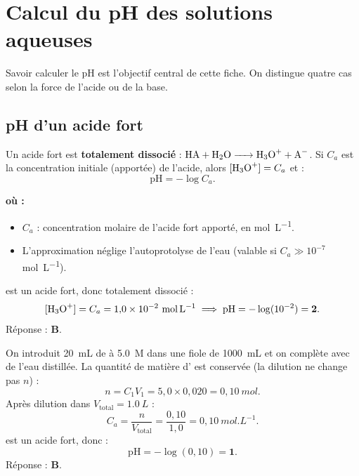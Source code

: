 \documentclass[11pt,a4paper]{article}
\newenvironment{ou}{%
  \par\smallskip\noindent\textbf{où :}\nopagebreak
  \begin{itemize}[leftmargin=1.8em,topsep=2pt,itemsep=1.5pt,parsep=0pt]}%
  {\end{itemize}}
\begin{document}
\section{Calcul du pH des solutions aqueuses}
\label{sec:pHfaible}
Savoir calculer le pH est l'objectif central de cette fiche. On distingue quatre cas selon la force de
l'acide ou de la base.

\subsection{pH d'un acide fort}

\begin{formule}
Un acide fort  est \textbf{totalement dissocié} : $\ce{HA + H2O -> H3O+ + A-}$. Si $C_a$ est la
concentration initiale (apportée) de l'acide, alors $[\ce{H3O+}] = C_a$ et :
\[ \boxed{\mathrm{pH} = -\log C_a}. \]
\end{formule}

\begin{ou}
\item $C_a$ : concentration molaire de l'acide fort apporté, en \si{mol.L^{-1}}.
\item L'approximation néglige l'autoprotolyse de l'eau (valable si $C_a \gg 10^{-7}$ \si{mol.L^{-1}}).
\end{ou}

\begin{exemple}
 est un acide fort, donc totalement dissocié :
\[ [\ce{H3O+}] = C_a = 1{,}0\times10^{-2}\ \si{mol.L^{-1}} \;\Longrightarrow\; \mathrm{pH} = -\log(10^{-2}) = \mathbf{2}. \]
Réponse : \textbf{B}.
\end{exemple}

\begin{exemple}
On introduit \SI{20}{mL} de  à \SI{5,0}{M} dans une fiole de \SI{1000}{mL} et on complète avec de
l'eau distillée. La quantité de matière d' est conservée (la dilution ne change pas $n$) :
\[ n = C_1 V_1 = 5{,}0 \times 0{,}020 = 0{,}10\ \si{mol}. \]
Après dilution dans $V_{\text{total}} = \SI{1,0}{L}$ :
\[ C_a = \frac{n}{V_{\text{total}}} = \frac{0{,}10}{1{,}0} = 0{,}10\ \si{mol.L^{-1}}. \]
 est un acide fort, donc :
\[ \mathrm{pH} = -\log(0{,}10) = \mathbf{1}. \]
Réponse : \textbf{B}.
\end{exemple}
\end{document}
